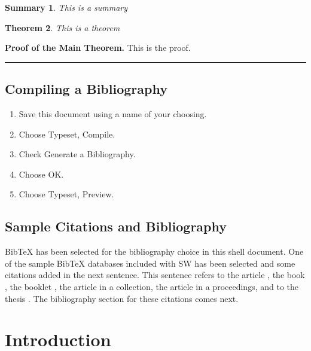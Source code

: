\documentclass{article}
\newtheorem{theorem}{Theorem}
\newtheorem{summary}[theorem]{Summary}
\newenvironment{proof}[1][Proof]{\noindent\textbf{#1.} }{\ \rule{0.5em}{0.5em}}
\begin{document}
\begin{summary}
This is a summary
\end{summary}

\begin{theorem}
This is a theorem
\end{theorem}

\begin{proof}[Proof of the Main Theorem]
This is the proof.
\end{proof}

\subsection{Compiling a Bibliography}

\begin{enumerate}
\item Save this document using a name of your choosing.

\item Choose \textsf{Typeset, Compile.}

\item Check \textsf{Generate a Bibliography.}

\item Choose \textsf{OK.}

\item Choose \textsf{Typeset, Preview.}
\end{enumerate}

\subsection{Sample Citations and Bibliography}

BibTeX has been selected for the bibliography choice in this shell document.
One of the sample BibTeX databases included with SW has been selected and
some citations added in the next sentence. This sentence refers to the
article \cite{article-full}, the book \cite{book-full}, the booklet \cite%
{booklet-full}, the article \cite{incollection-full} in a collection, the
article \cite{inproceedings-full} in a proceedings, and to the thesis \cite%
{phdthesis-full}. The bibliography section for these citations comes next.




\section{Introduction}
\end{document}
